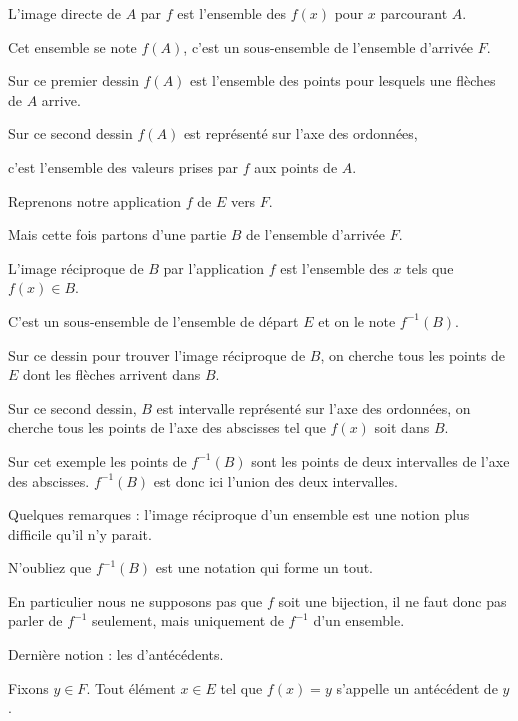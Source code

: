 L'image directe de $A$ par $f$ est l'ensemble
des $f(x)$ pour $x$ parcourant $A$.

Cet ensemble se note $f(A)$, c'est un sous-ensemble de l'ensemble d'arrivée $F$.

\change

Sur ce premier dessin $f(A)$ est l'ensemble des points 
pour lesquels une flèches de $A$ arrive.

\change


Sur ce second dessin $f(A)$ est représenté sur l'axe des ordonnées, 

c'est l'ensemble des valeurs prises par $f$ aux  points de $A$.


\diapo

Reprenons notre application $f$ de $E$ vers $F$.

Mais cette fois partons d'une partie $B$ de l'ensemble d'arrivée $F$.


L'image réciproque de $B$ par l'application $f$ est l'ensemble
des $x$ tels que $f(x) \in B$.

C'est un sous-ensemble de l'ensemble de départ $E$ et on le note  $f^{-1}(B)$.

\change

Sur ce dessin pour trouver l'image réciproque de $B$, on cherche tous les points de $E$
dont les flèches arrivent dans $B$.

\change

Sur ce second dessin, $B$ est intervalle représenté sur l'axe des ordonnées,
on cherche tous les points de l'axe des abscisses tel que $f(x)$ soit dans $B$.

Sur cet exemple les points de $f^{-1}(B)$ sont les points de deux intervalles de l'axe des abscisses.
$f^{-1}(B)$ est donc ici l'union des deux intervalles. 


Quelques remarques : l'image réciproque d'un ensemble est une notion plus difficile
qu'il n'y parait. 

N'oubliez que $f^{-1}(B)$ est une notation qui forme un tout. 

En particulier nous ne supposons
pas que $f$ soit une bijection, il ne faut donc pas parler de $f^{-1}$ seulement,
mais uniquement de $f^{-1}$ d'un ensemble.



\diapo

Dernière notion : les d'antécédents.

Fixons $y \in F$. Tout élément $x\in E$ tel que $f(x)=y$ s'appelle un antécédent
de $y$.

